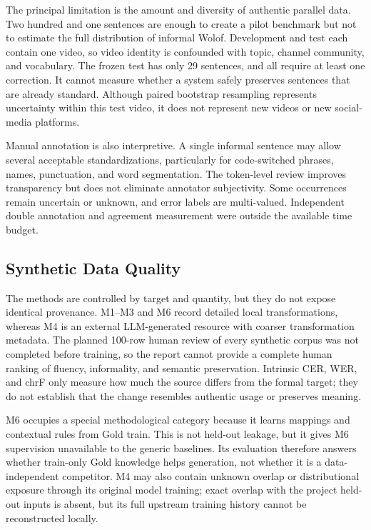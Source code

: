 \documentclass[12pt, a4paper, twoside, openany]{report}
\begin{document}
The principal limitation is the amount and diversity of authentic parallel data. Two hundred and one sentences are enough to create a pilot benchmark but not to estimate the full distribution of informal Wolof. Development and test each contain one video, so video identity is confounded with topic, channel community, and vocabulary. The frozen test has only 29 sentences, and all require at least one correction. It cannot measure whether a system safely preserves sentences that are already standard. Although paired bootstrap resampling represents uncertainty within this test video, it does not represent new videos or new social-media platforms.

Manual annotation is also interpretive. A single informal sentence may allow several acceptable standardizations, particularly for code-switched phrases, names, punctuation, and word segmentation. The token-level review improves transparency but does not eliminate annotator subjectivity. Some occurrences remain uncertain or unknown, and error labels are multi-valued. Independent double annotation and agreement measurement were outside the available time budget.

\subsection{Synthetic Data Quality}

The methods are controlled by target and quantity, but they do not expose identical provenance. M1--M3 and M6 record detailed local transformations, whereas M4 is an external LLM-generated resource with coarser transformation metadata. The planned 100-row human review of every synthetic corpus was not completed before training, so the report cannot provide a complete human ranking of fluency, informality, and semantic preservation. Intrinsic CER, WER, and chrF only measure how much the source differs from the formal target; they do not establish that the change resembles authentic usage or preserves meaning.

M6 occupies a special methodological category because it learns mappings and contextual rules from Gold train. This is not held-out leakage, but it gives M6 supervision unavailable to the generic baselines. Its evaluation therefore answers whether train-only Gold knowledge helps generation, not whether it is a data-independent competitor. M4 may also contain unknown overlap or distributional exposure through its original model training; exact overlap with the project held-out inputs is absent, but its full upstream training history cannot be reconstructed locally.
\end{document}

